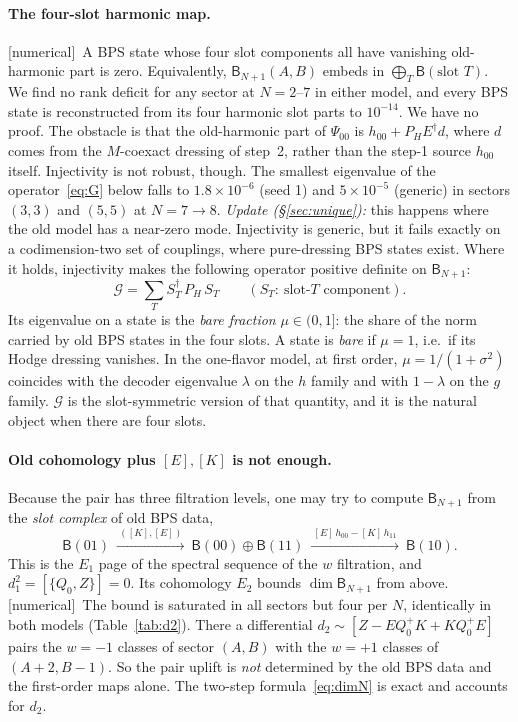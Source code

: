 \documentclass[11pt]{article}
\newcommand{\B}{\mathsf B}
\newcommand{\PH}{P_{\!H}}
\newcommand{\tagbox}[2]{\textsf{\small\color{#1}[#2]}}
\newcommand{\NUM}{\tagbox{cnum}{numerical}}
\theoremstyle{plain}
\theoremstyle{remark}
\numberwithin{equation}{section}
\begin{document}
\paragraph{The four-slot harmonic map.} \NUM\ A BPS state whose four slot components all have vanishing old-harmonic part
is zero. Equivalently, $\B_{N+1}(A,B)$ embeds in $\bigoplus_T\B(\text{slot }T)$. We find no rank deficit for any sector
at $N=2$--$7$ in either model, and every BPS state is reconstructed from its four harmonic slot parts to $10^{-14}$. We
have no proof. The obstacle is that the old-harmonic part of $\Psi_{00}$ is $h_{00}+\PH E^\dagger d$, where $d$ comes
from the $M$-coexact dressing of step~2, rather than the step-1 source $h_{00}$ itself. Injectivity is not
robust, though. The smallest eigenvalue of the operator~\eqref{eq:G} below falls to $1.8\times10^{-6}$ (seed 1) and
$5\times10^{-5}$ (generic) in sectors $(3,3)$ and $(5,5)$ at $N=7\to8$. \emph{Update (\S\ref{sec:unique}):} this happens
where the old model has a near-zero mode. Injectivity is generic, but it fails exactly on a codimension-two set of
couplings, where pure-dressing BPS states exist. Where it holds, injectivity makes the following operator positive
definite on $\B_{N+1}$:
\begin{equation}\label{eq:G}
\mathcal G=\sum_T S_T^\dagger\,\PH\,S_T\qquad(S_T:\ \text{slot-}T\text{ component}).
\end{equation}
Its eigenvalue on a state is the \emph{bare fraction} $\mu\in(0,1]$: the share of the norm carried by old BPS states
in the four slots. A state is \emph{bare} if $\mu=1$, i.e.\ if its Hodge dressing vanishes. In the one-flavor model, at
first order, $\mu=1/(1+\sigma^2)$ coincides with the decoder eigenvalue $\lambda$ on the $h$ family and with $1-\lambda$
on the $g$ family. $\mathcal G$ is the slot-symmetric version of that quantity, and it is the natural object when there
are four slots.

\paragraph{Old cohomology plus $[E],[K]$ is not enough.} Because the pair has three filtration levels, one may try to
compute $\B_{N+1}$ from the \emph{slot complex} of old BPS data,
\begin{equation}\label{eq:slotcomplex}
\B(01)\ \xrightarrow{\ ([K],[E])\ }\ \B(00)\oplus\B(11)\ \xrightarrow{\ [E]\,h_{00}-[K]\,h_{11}\ }\ \B(10).
\end{equation}
This is the $E_1$ page of the spectral sequence of the $w$ filtration, and $d_1^2=[\{Q_0,Z\}]=0$. Its cohomology $E_2$
bounds $\dim\B_{N+1}$ from above. \NUM\ The bound is saturated in all sectors but four per $N$, identically in both
models (Table~\ref{tab:d2}). There a differential $d_2\sim[Z-EQ_0^+K+KQ_0^+E]$ pairs the $w=-1$ classes of sector
$(A,B)$ with the $w=+1$ classes of $(A+2,B-1)$. So the pair uplift is \emph{not} determined by the old BPS data and the
first-order maps alone. The two-step formula~\eqref{eq:dimN} is exact and accounts for $d_2$.
\end{document}
